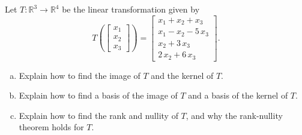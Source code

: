
\begin{exerciseStatement}
 Let \(T:\mathbb{R}^ 3  \to \mathbb{R}^ 4 \) be the linear transformation given by \[T\left(  \left[\begin{array}{c}
x_{1} \\
x_{2} \\
x_{3}
\end{array}\right]  \right) =  \left[\begin{array}{c}
x_{1} + x_{2} + x_{3} \\
x_{1} - x_{2} - 5 \, x_{3} \\
x_{2} + 3 \, x_{3} \\
2 \, x_{2} + 6 \, x_{3}
\end{array}\right] .\]
\begin{enumerate}[(a)]
\item Explain how to find the image of \(T\) and the kernel of \(T\).
\item Explain how to find a basis of the image of \(T\) and a basis of the kernel of \(T\).
\item Explain how to find the rank and nullity of \(T\), and why the rank-nullity theorem holds for \(T\).
\end{enumerate}
    
\end{exerciseStatement}
    
